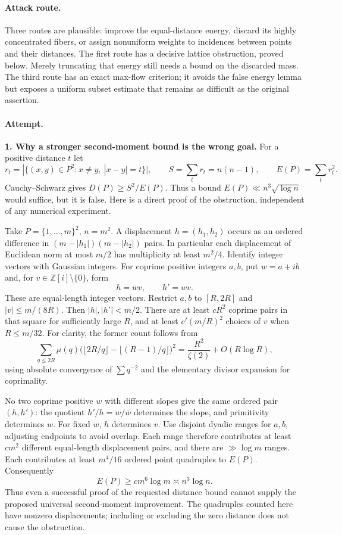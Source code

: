 \documentclass[11pt,a4paper]{article}
\newcommand{\Z}{\mathbb{Z}}
\numberwithin{equation}{section}
\begin{document}
\paragraph{Attack route.}
Three routes are plausible: improve the equal-distance energy, discard
its highly concentrated fibers, or assign nonuniform weights to incidences
between points and their distances. The first route has a decisive lattice
obstruction, proved below. Merely truncating that energy still needs a
bound on the discarded mass. The third route has an exact max-flow
criterion; it avoids the false energy lemma but exposes a uniform subset
estimate that remains as difficult as the original assertion.

\paragraph{Attempt.}
\textbf{1. Why a stronger second-moment bound is the wrong goal.}
For a positive distance $t$ let
\[
 r_t=|\{(x,y)\in P^2:x\ne y,\ |x-y|=t\}|,
 \qquad S=\sum_t r_t=n(n-1),\qquad E(P)=\sum_t r_t^2.
\]
Cauchy--Schwarz gives $D(P)\ge S^2/E(P)$. Thus a bound
$E(P)\ll n^3\sqrt{\log n}$ would suffice, but it is false.
Here is a direct proof of the obstruction, independent of any numerical
experiment.

Take $P=\{1,\ldots,m\}^2$, $n=m^2$. A displacement
$h=(h_1,h_2)$ occurs as an ordered difference in
$(m-|h_1|)(m-|h_2|)$ pairs. In particular each displacement of Euclidean
norm at most $m/2$ has multiplicity at least $m^2/4$. Identify integer
vectors with Gaussian integers. For coprime positive integers $a,b$,
put $w=a+ib$ and, for $v\in\Z[i]\setminus\{0\}$, form
\[
 h=\overline w v,\qquad h'=wv.
\]
These are equal-length integer vectors. Restrict $a,b$ to $[R,2R]$ and
$|v|\le m/(8R)$. Then $|h|,|h'|<m/2$. There are at least $cR^2$
coprime pairs in that square for sufficiently large $R$, and at least
$c'(m/R)^2$ choices of $v$ when $R\le m/32$. For clarity, the former
count follows from
\[
 \sum_{q\le2R}\mu(q)
 \bigl(\lfloor2R/q\rfloor-\lfloor(R-1)/q\rfloor\bigr)^2
 =\frac{R^2}{\zeta(2)}+O(R\log R),
\]
using absolute convergence of $\sum q^{-2}$ and the elementary divisor
expansion for coprimality.

No two coprime positive $w$ with different slopes give the same ordered
pair $(h,h')$: the quotient $h'/h=w/\overline w$ determines the slope,
and primitivity determines $w$. For fixed $w$, $h$ determines $v$.
Use disjoint dyadic ranges for $a,b$, adjusting endpoints to avoid overlap.
Each range therefore contributes at least $cm^2$ different equal-length
displacement pairs, and there are $\gg\log m$ ranges. Each contributes
at least $m^4/16$ ordered point quadruples to $E(P)$. Consequently
\begin{equation}\label{218:lattice}
 E(P)\ge c m^6\log m\asymp n^3\log n.
\end{equation}
Thus even a successful proof of the requested distance bound cannot
supply the proposed universal second-moment improvement. The quadruples
counted here have nonzero displacements; including or excluding the zero
distance does not cause the obstruction.
\end{document}
